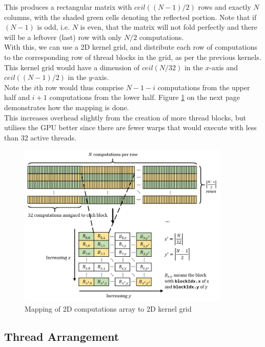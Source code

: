 \documentclass[12pt]{article}
\begin{document}
This produces a rectangular matrix with $ceil((N - 1) / 2)$ rows and exactly $N$ columns, with the shaded green cells denoting the reflected portion. Note that if $(N - 1)$ is odd, i.e. $N$ is even, that the matrix will not fold perfectly and there will be a leftover (last) row with only $N / 2$ computations.\\

With this, we can use a 2D kernel grid, and distribute each row of computations to the corresponding row of thread blocks in the grid, as per the previous kernels. This kernel grid would have a dimension of $ceil(N / 32)$ in the $x$-axis and $ceil((N - 1) / 2)$ in the $y$-axis.\\

Note the $i$th row would thus comprise $N - 1 - i$ computations from the upper half and $i + 1$ computations from the lower half. Figure \ref{fig:collisionMatrixMapping} on the next page demonstrates how the mapping is done.\\

This increases overhead slightly from the creation of more thread blocks, but utilises the GPU better since there are fewer warps that would execute with less than 32 active threads.

\begin{figure}[H]
    \centering
    \includegraphics[width=0.9\textwidth]{reportAssets/chap32DCollisionPairMapping.png}
    \caption{Mapping of 2D computations array to 2D kernel grid}
    \label{fig:collisionMatrixMapping}
\end{figure}

\subsection{Thread Arrangement}
\end{document}
